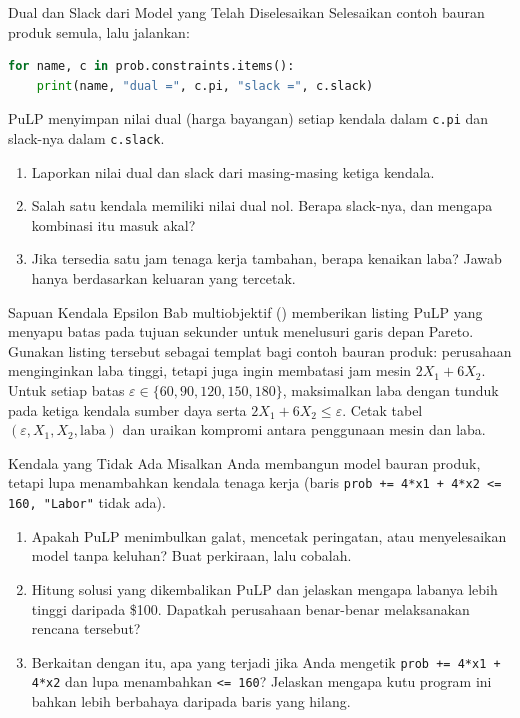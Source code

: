 \begin{ex}{Dual dan Slack dari Model yang Telah Diselesaikan}{}
\label{ex:pulp-duals}
Selesaikan contoh bauran produk semula, lalu jalankan:
\begin{lstlisting}[language=Python]
for name, c in prob.constraints.items():
    print(name, "dual =", c.pi, "slack =", c.slack)
\end{lstlisting}
PuLP menyimpan nilai dual (harga bayangan) setiap kendala dalam \texttt{c.pi} dan slack-nya dalam \texttt{c.slack}.
\begin{enumerate}
\item Laporkan nilai dual dan slack dari masing-masing ketiga kendala.
\item Salah satu kendala memiliki nilai dual nol. Berapa slack-nya, dan mengapa kombinasi itu masuk akal?
\item Jika tersedia satu jam tenaga kerja tambahan, berapa kenaikan laba? Jawab hanya berdasarkan keluaran yang tercetak.
\end{enumerate}
\end{ex}

\begin{ex}{Sapuan Kendala Epsilon}{}
\label{ex:pulp-epsilon}
Bab multiobjektif (\OOMultiobjectiveToolsReference{}) memberikan listing PuLP yang menyapu batas pada tujuan sekunder untuk menelusuri garis depan Pareto. Gunakan listing tersebut sebagai templat bagi contoh bauran produk: perusahaan menginginkan laba tinggi, tetapi juga ingin membatasi jam mesin $2X_1 + 6X_2$. Untuk setiap batas $\varepsilon \in \{60, 90, 120, 150, 180\}$, maksimalkan laba dengan tunduk pada ketiga kendala sumber daya serta $2X_1 + 6X_2 \leq \varepsilon$. Cetak tabel $(\varepsilon, X_1, X_2, \text{laba})$ dan uraikan kompromi antara penggunaan mesin dan laba.
\end{ex}


\begin{ex}{Kendala yang Tidak Ada}{}
\label{ex:pulp-missing-constraint}
Misalkan Anda membangun model bauran produk, tetapi lupa menambahkan kendala tenaga kerja (baris \texttt{prob += 4*x1 + 4*x2 <= 160, "Labor"} tidak ada).
\begin{enumerate}
\item Apakah PuLP menimbulkan galat, mencetak peringatan, atau menyelesaikan model tanpa keluhan? Buat perkiraan, lalu cobalah.
\item Hitung solusi yang dikembalikan PuLP dan jelaskan mengapa labanya lebih tinggi daripada \$100. Dapatkah perusahaan benar-benar melaksanakan rencana tersebut?
\item Berkaitan dengan itu, apa yang terjadi jika Anda mengetik \texttt{prob += 4*x1 + 4*x2} dan lupa menambahkan \texttt{<= 160}? Jelaskan mengapa kutu program ini bahkan lebih berbahaya daripada baris yang hilang.
\end{enumerate}
\end{ex}

